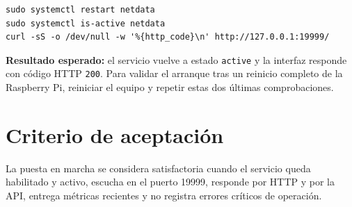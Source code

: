 \begin{lstlisting}[style=terminal]
sudo systemctl restart netdata
sudo systemctl is-active netdata
curl -sS -o /dev/null -w '%{http_code}\n' http://127.0.0.1:19999/
\end{lstlisting}

\textbf{Resultado esperado:} el servicio vuelve a estado \texttt{active} y la
interfaz responde con código HTTP \texttt{200}. Para validar el arranque tras
un reinicio completo de la Raspberry Pi, reiniciar el equipo y repetir estas
dos últimas comprobaciones.

\section{Criterio de aceptación}

La puesta en marcha se considera satisfactoria cuando el servicio queda
habilitado y activo, escucha en el puerto 19999, responde por HTTP y por la API,
entrega métricas recientes y no registra errores críticos de operación.
